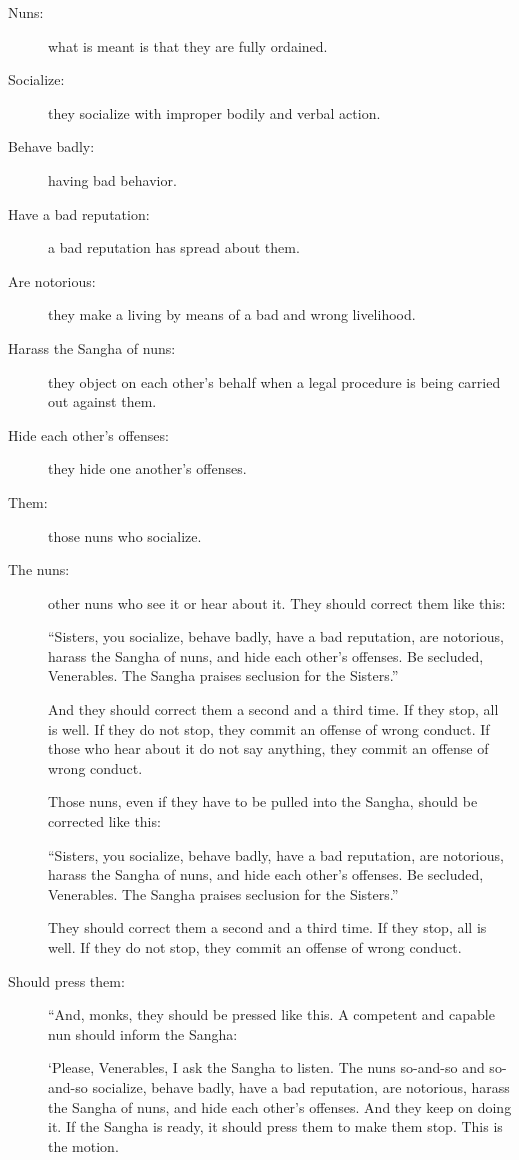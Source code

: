 \documentclass[12pt,openany]{book}%
\begin{document}
\begin{description}%
\item[Nuns: ] what is meant is that they are fully ordained. %
\item[Socialize: ] they socialize with improper bodily and verbal action. %
\item[Behave badly: ] having bad behavior. %
\item[Have a bad reputation: ] a bad reputation has spread about them. %
\item[Are notorious: ] they make a living by means of a bad and wrong livelihood. %
\item[Harass the Sangha of nuns: ] they object on each other’s behalf when a legal procedure is being carried out against them. %
\item[Hide each other’s offenses: ] they hide one another’s offenses. %
\item[Them: ] those nuns who socialize. %
\item[The nuns: ] other nuns who see it or hear about it. They should correct them like this: 

“Sisters, you socialize, behave badly, have a bad reputation, are notorious, harass the Sangha of nuns, and hide each other’s offenses. Be secluded, Venerables. The Sangha praises seclusion for the Sisters.” 

And they should correct them a second and a third time. If they stop, all is well. If they do not stop, they commit an offense of wrong conduct. If those who hear about it do not say anything, they commit an offense of wrong conduct. 

Those nuns, even if they have to be pulled into the Sangha, should be corrected like this: 

“Sisters, you socialize, behave badly, have a bad reputation, are notorious, harass the Sangha of nuns, and hide each other’s offenses. Be secluded, Venerables. The Sangha praises seclusion for the Sisters.” 

They should correct them a second and a third time. If they stop, all is well. If they do not stop, they commit an offense of wrong conduct. 

%
\item[Should press them: ] “And, monks, they should be pressed like this. A competent and capable nun should inform the Sangha: 

‘Please, Venerables, I ask the Sangha to listen. The nuns so-and-so and so-and-so socialize, behave badly, have a bad reputation, are notorious, harass the Sangha of nuns, and hide each other’s offenses. And they keep on doing it. If the Sangha is ready, it should press them to make them stop. This is the motion. 


\end{description}
\end{document}
